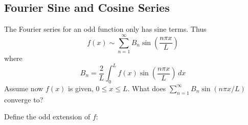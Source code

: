\documentclass{article}
\begin{document}
	\subsection{Fourier Sine and Cosine Series}
	
	The Fourier series for an odd function only has sine terms. Thus
	\[
		f(x) \sim \sum\limits_{n=1}^{\infty} B_n \sin\left( \frac{n\pi x}{L} \right)
	\]
	where
	\[
		B_n = \frac{2}{L} \int_0^L f(x) \sin\left( \frac{n\pi x}{L} \right) \, dx
	\]
	Assume now $f(x)$ is given, $0\leq x\leq L$. What does $\sum_{n=1}^{\infty}B_n\sin\left(n\pi x/L \right) $ converge to?

	Define the odd extension of $f$: 
	
\end{document}
